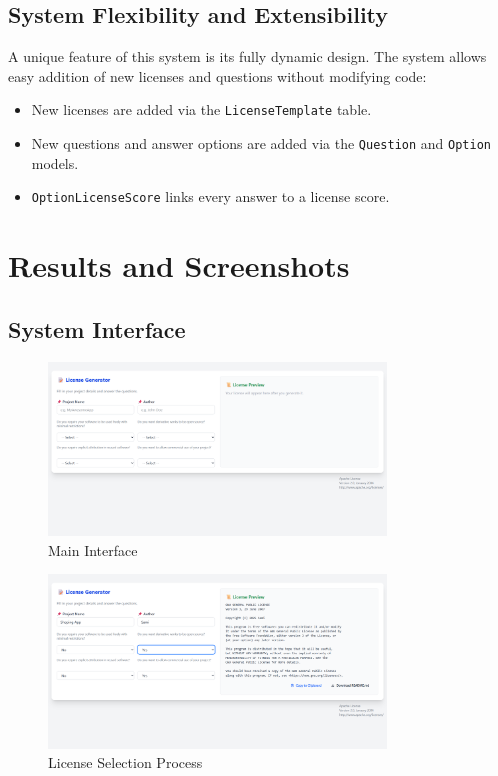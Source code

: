 \documentclass[12pt,a4paper]{report}
\begin{document}
\section{System Flexibility and Extensibility}
A unique feature of this system is its fully dynamic design. The system allows easy addition of new licenses and questions without modifying code:

\begin{itemize}
    \item New licenses are added via the \texttt{LicenseTemplate} table.
    \item New questions and answer options are added via the \texttt{Question} and \texttt{Option} models.
    \item \texttt{OptionLicenseScore} links every answer to a license score.
\end{itemize}

\chapter{Results and Screenshots}
\section{System Interface}
\begin{figure}[H]
    \centering
    \includegraphics[width=0.8\textwidth]{Screenshots/os1.png}
    \caption{Main Interface}
\end{figure}

\begin{figure}[H]
    \centering
    \includegraphics[width=0.8\textwidth]{Screenshots/os2.png}
    \caption{License Selection Process}
\end{figure}
\end{document}
